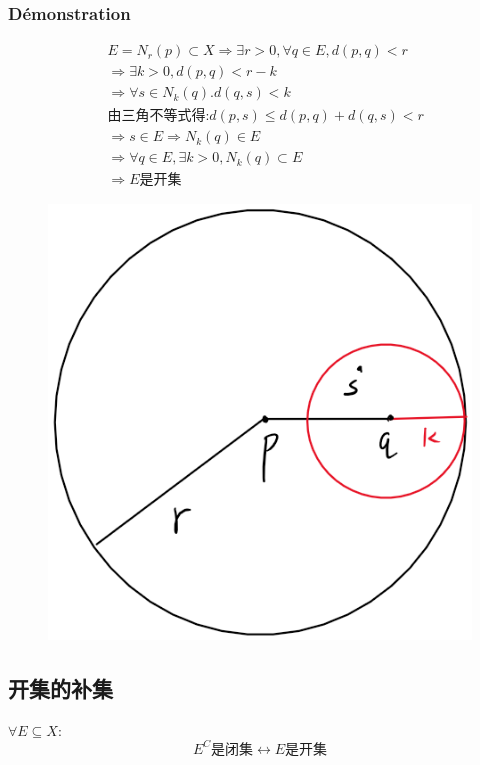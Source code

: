 \documentclass[12pt, a4paper, oneside]{ctexbook}
\begin{document}
  \subsubsection{Démonstration}
  $$
  \begin{aligned}&
  E=N_r(p)\subset X\Rightarrow \exists r>0, \forall q\in E,d(p,q)<r\\ &
  \Rightarrow \exists k>0,d(p,q)<r-k\\ &
  \Rightarrow \forall s\in N_k(q).d(q,s)<k\\ &
  \text{由三角不等式得:}d(p,s)\leq d(p,q)+d(q,s)<r\\ &
  \Rightarrow s\in E\Rightarrow N_k(q)\in E\\ &
  \Rightarrow \forall q\in E, \exists k>0 , N_k(q)\subset E\\ &
  \Rightarrow E\text{是开集}
  \end{aligned}
  $$
  \begin{figure}[H]%
    \centering
    \includegraphics[scale=0.5]{linyushikaiji.png}
  \end{figure}

  \subsection{开集的补集}
  $\forall E\subseteq X:$
  $$
  E^C\text{是闭集}\leftrightarrow E\text{是开集}
  $$
\end{document}

